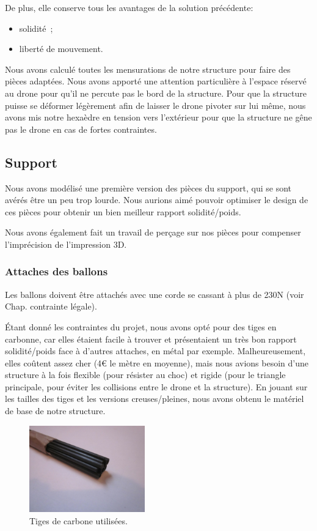 \documentclass[a4paper,11pt]{article}
\begin{document}
De plus, elle conserve tous les avantages de la solution précédente:
\begin{itemize}
	\item solidité~;
	\item liberté de mouvement.
\end{itemize}

Nous avons calculé toutes les mensurations de notre structure pour faire des pièces adaptées. Nous avons apporté une attention particulière à l'espace réservé au drone pour qu'il ne percute pas le bord de la structure. Pour que la structure puisse se déformer légèrement afin de laisser le drone pivoter sur lui même, nous avons mis notre hexaèdre en tension vers l'extérieur pour que la structure ne gêne pas le drone en cas de fortes contraintes.

\subsection{Support}

Nous avons modélisé une première version des pièces du support, qui se sont avérés être un peu trop lourde. Nous aurions aimé pouvoir optimiser le design de ces pièces pour obtenir un bien meilleur rapport solidité/poids.

Nous avons également fait un travail de perçage sur nos pièces pour compenser l'imprécision de l'impression 3D.

\subsubsection{Attaches des ballons}

Les ballons doivent être attachés avec une corde se cassant à plus de 230N (voir Chap. contrainte légale).

Étant donné les contraintes du projet, nous avons opté pour des tiges en carbonne, car elles étaient facile à trouver et présentaient un très bon rapport solidité/poids face à d'autres attaches, en métal par exemple. Malheureusement, elles coûtent assez cher (4€ le mètre en moyenne), mais nous avions besoin d'une structure à la fois flexible (pour résister au choc) et rigide (pour le triangle principale, pour éviter les collisions entre le drone et la structure). En jouant sur les tailles des tiges et les versions creuses/pleines, nous avons obtenu le matériel de base de notre structure.

\begin{figure}[H]
	\centering
	\includegraphics[width=5cm]{../Images/tige_carbone.JPG}
	\caption{Tiges de carbone utilisées.}
\end{figure}
\end{document}
